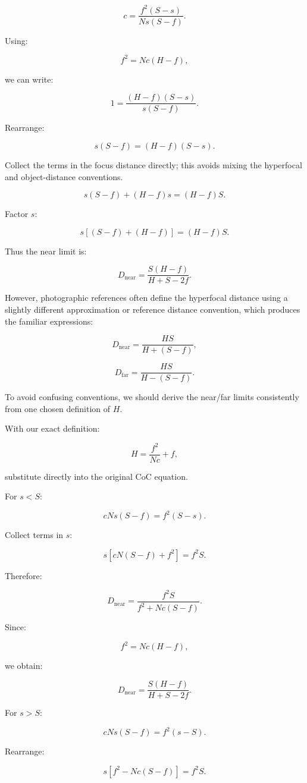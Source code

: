 \[ c= \frac{f^2(S-s)}{Ns(S-f)}. \]

Using:

\[ f^2=Nc(H-f), \]

we can write:

\[ 1= \frac{(H-f)(S-s)}{s(S-f)}. \]

Rearrange:

\[ s(S-f)=(H-f)(S-s). \]

Collect the terms in the focus distance directly; this avoids mixing the hyperfocal and object-distance conventions.

\[ s(S-f)+(H-f)s=(H-f)S. \]

Factor \(s\):

\[ s[(S-f)+(H-f)]=(H-f)S. \]

Thus the near limit is:

\[ \boxed{ D_{\mathrm{near}} = \frac{S(H-f)}{H+S-2f}. } \]

However, photographic references often define the hyperfocal distance using a slightly different approximation or reference distance convention, which produces the familiar expressions:

\[ \boxed{ D_{\mathrm{near}} = \frac{HS}{H+(S-f)}, } \]

\[ \boxed{ D_{\mathrm{far}} = \frac{HS}{H-(S-f)}. } \]

To avoid confusing conventions, we should derive the near/far limits consistently from one chosen definition of \(H\).

With our exact definition:

\[ H=\frac{f^2}{Nc}+f, \]

substitute directly into the original CoC equation.

For \(s<S\):

\[ cNs(S-f)=f^2(S-s). \]

Collect terms in \(s\):

\[ s[cN(S-f)+f^2]=f^2S. \]

Therefore:

\[ \boxed{ D_{\mathrm{near}} = \frac{f^2S}{f^2+Nc(S-f)}. } \]

Since:

\[ f^2=Nc(H-f), \]

we obtain:

\[ \boxed{ D_{\mathrm{near}} = \frac{S(H-f)}{H+S-2f}. } \]

For \(s>S\):

\[ cNs(S-f)=f^2(s-S). \]

Rearrange:

\[ s[f^2-Nc(S-f)]=f^2S. \]

